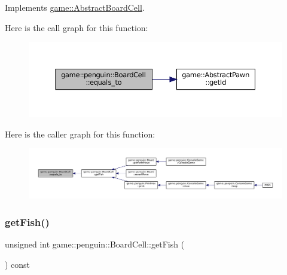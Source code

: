 Implements \hyperlink{classgame_1_1_abstract_board_cell_a3939330bed75f3a408af228e86ec93af}{game\+::\+Abstract\+Board\+Cell}.

Here is the call graph for this function\+:
\nopagebreak
\begin{figure}[H]
\begin{center}
\leavevmode
\includegraphics[width=350pt]{classgame_1_1penguin_1_1_board_cell_a1ed5a3134f831bef111c6294c07388bf_cgraph}
\end{center}
\end{figure}
Here is the caller graph for this function\+:
\nopagebreak
\begin{figure}[H]
\begin{center}
\leavevmode
\includegraphics[width=350pt]{classgame_1_1penguin_1_1_board_cell_a1ed5a3134f831bef111c6294c07388bf_icgraph}
\end{center}
\end{figure}
\mbox{\label{classgame_1_1penguin_1_1_board_cell_abe8f2dc0eef3aed1e8701dc0b021c5a6}} 
\subsubsection{\texorpdfstring{get\+Fish()}{getFish()}}
{\footnotesize\ttfamily unsigned int game\+::penguin\+::\+Board\+Cell\+::get\+Fish (\begin{DoxyParamCaption}{ }\end{DoxyParamCaption}) const\hspace{0.3cm}{\ttfamily [inline]}}



